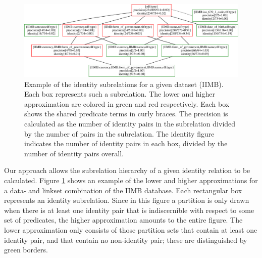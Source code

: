 \begin{figure}
\label{fig:ihierarchy}
\centering
\includegraphics[width=\textwidth]{./img/iimb_16_2}
\caption{
  Example of the identity subrelations for a given dataset (IIMB).
  Each box represents such a subrelation.
  The lower and higher approximation are colored in green and red
    respectively.
  Each box shows the shared predicate terms in curly braces.
  The precision is calculated as
    the number of identity pairs in the subrelation
  divided by
    the number of pairs in the subrelation.
  The identity figure indicates the number of identity pairs in each box,
    divided by the number of identity pairs overall.
}
\end{figure}

Our approach allows the subrelation hierarchy of a given identity relation
  to be calculated.
Figure \ref{fig:ihierarchy} shows an example of the lower and higher
  approximations for a data- and linkset combination of the IIMB database.
Each rectangular box represents an identity subrelation.
Since in this figure a partition is only drawn when there is at least one
  identity pair that is indiscernible with respect to some set of
  predicates, the higher approximation amounts to the entire figure.
The lower approximation only consists of those partition sets that contain
  at least one identity pair, and that contain no non-identity pair;
  these are distinguished by green borders.

